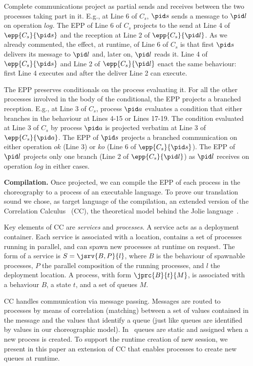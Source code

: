 Complete communications project as partial sends and receives
between the two processes taking part in it. E.g., at Line 6 of $C_s$, $\pid s$
sends a message to $\pid l$ on operation $log$. The EPP of Line 6 of $C_s$
projects to the send at Line 4 of $\epp{C_s}{\pid s}$ and the reception at Line
2 of $\epp{C_s}{\pid l}$. As we already commented, the effect, at runtime, of
Line 6 of $C_s$ is that first $\pid s$ delivers its message to $\pid l$ and,
later on, $\pid l$ reads it. Line 4 of $\epp{C_s}{\pid s}$ and Line 2 of
$\epp{C_s}{\pid l}$ enact the same behaviour: first Line 4 executes
 and after the deliver Line 2 can execute.

The EPP preserves conditionals on the process evaluating it. For all the
other processes involved in the body of the conditional, the EPP projects a
branched reception. E.g., at Line 3 of $C_s$, process $\pid a$ evaluates a
condition that either branches in the behaviour at Lines 4-15 or Lines 17-19.
The condition evaluated at Line 3 of $C_s$ by process $\pid a$ is projected
verbatim at Line 3 of $\epp{C_s}{\pid a}$. The EPP of $\pid s$ projects a
branched communication on either operation $ok$ (Line 3) or $ko$ (Line 6 of
$\epp {C_s} {\pid s}$). The EPP of $\pid l$ projects only one branch (Line 2
of $\epp{C_s}{\pid l}$) as $\pid l$ receives on operation $log$ in either cases.

\textbf{Compilation.}
Once projected, we can compile the EPP of each process in the choreography to
a process of an executable language. To prove our translation sound we chose,
as target language of the compilation, an extended version of the Correlation
Calculus~\cite{MC11} (CC), the theoretical model behind the Jolie
language~\cite{jolie:website}.

Key elements of CC are \emph{services} and \emph{processes}. A service acts
as a deployment container. Each service is associated with a location,
contains a set of processes running in parallel, and can spawn new processes
at runtime on request. The form of a service is $S =\jsrv {B, P} {l}$, where
$B$ is the behaviour of spawnable processes, $P$ the parallel composition of
the running processes, and $l$ the deployment location. A process, with form
$\jprc{B}{t}{M}$, is associated with a behaviour $B$, a state $t$, and a set
of queues $M$.

CC handles communication via message passing. Messages are routed to
processes by means of correlation (matching) between a set of values
contained in the message and the values that identify a queue (just like
queues are identified by values in our choreographic model). In~\cite{MC11}
queues are static and assigned when a new process is created. To support the
runtime creation of new session, we present in this paper an extension of CC
that enables processes to create new queues at runtime.

